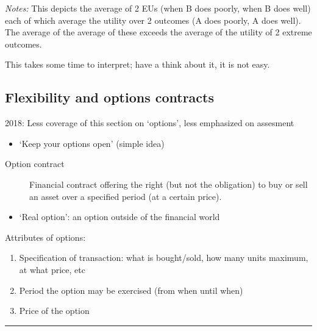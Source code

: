 \documentclass[]{article}
\providecommand{\tightlist}{%
  \setlength{\itemsep}{0pt}\setlength{\parskip}{0pt}}
\begin{document}
\emph{Notes:} This depicts the average of 2 EUs (when B does poorly,
when B does well) each of which average the utility over 2 outcomes (A
does poorly, A does well). The average of the average of these exceeds
the average of the utility of 2 extreme outcomes.

This takes some time to interpret; have a think about it, it is not
easy.

\hypertarget{flexibility-and-options-contracts}{%
\subsection{Flexibility and options
contracts}\label{flexibility-and-options-contracts}}

2018: Less coverage of this section on `options', less emphasized on
assesment

\begin{itemize}
\tightlist
\item
  `Keep your options open' (simple idea)
\end{itemize}

\bigskip

\begin{description}
\item[Option contract]
Financial contract offering the right (but not the obligation) to buy or
sell an asset over a specified period (at a certain price).
\end{description}

\begin{itemize}
\tightlist
\item
  `Real option': an option outside of the financial world
\end{itemize}

\bigskip

Attributes of options:

\begin{enumerate}
\def\labelenumi{\arabic{enumi}.}
\tightlist
\item
  Specification of transaction: what is bought/sold, how many units
  maximum, at what price, etc
\item
  Period the option may be exercised (from when until when)
\item
  Price of the option
\end{enumerate}

\begin{center}\rule{0.5\linewidth}{\linethickness}\end{center}
\end{document}

